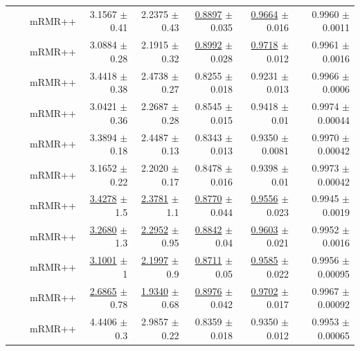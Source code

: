 \begin{longtable}{llp{}rrrrr}
 &  & mRMR++ & 3.1567 {\scriptsize $\pm$ 0.41} & 2.2375 {\scriptsize $\pm$ 0.43} & \underline{0.8897} {\scriptsize $\pm$ 0.035} & \underline{0.9664} {\scriptsize $\pm$ 0.016} & 0.9960 {\scriptsize $\pm$ 0.0011} \\
 &  & mRMR++ & 3.0884 {\scriptsize $\pm$ 0.28} & 2.1915 {\scriptsize $\pm$ 0.32} & \underline{0.8992} {\scriptsize $\pm$ 0.028} & \underline{0.9718} {\scriptsize $\pm$ 0.012} & 0.9961 {\scriptsize $\pm$ 0.0016} \\
 &  & mRMR++ & 3.4418 {\scriptsize $\pm$ 0.38} & 2.4738 {\scriptsize $\pm$ 0.27} & 0.8255 {\scriptsize $\pm$ 0.018} & 0.9231 {\scriptsize $\pm$ 0.013} & 0.9966 {\scriptsize $\pm$ 0.0006} \\
 &  & mRMR++ & 3.0421 {\scriptsize $\pm$ 0.36} & 2.2687 {\scriptsize $\pm$ 0.28} & 0.8545 {\scriptsize $\pm$ 0.015} & 0.9418 {\scriptsize $\pm$ 0.01} & 0.9974 {\scriptsize $\pm$ 0.00044} \\
 &  & mRMR++ & 3.3894 {\scriptsize $\pm$ 0.18} & 2.4487 {\scriptsize $\pm$ 0.13} & 0.8343 {\scriptsize $\pm$ 0.013} & 0.9350 {\scriptsize $\pm$ 0.0081} & 0.9970 {\scriptsize $\pm$ 0.00042} \\
 &  & mRMR++ & 3.1652 {\scriptsize $\pm$ 0.22} & 2.2020 {\scriptsize $\pm$ 0.17} & 0.8478 {\scriptsize $\pm$ 0.016} & 0.9398 {\scriptsize $\pm$ 0.01} & 0.9973 {\scriptsize $\pm$ 0.00042} \\
 &  & mRMR++ & \underline{3.4278} {\scriptsize $\pm$ 1.5} & \underline{2.3781} {\scriptsize $\pm$ 1.1} & \underline{0.8770} {\scriptsize $\pm$ 0.044} & \underline{0.9556} {\scriptsize $\pm$ 0.023} & 0.9945 {\scriptsize $\pm$ 0.0019} \\
 &  & mRMR++ & \underline{3.2680} {\scriptsize $\pm$ 1.3} & \underline{2.2952} {\scriptsize $\pm$ 0.95} & \underline{0.8842} {\scriptsize $\pm$ 0.04} & \underline{0.9603} {\scriptsize $\pm$ 0.021} & 0.9952 {\scriptsize $\pm$ 0.0016} \\
 &  & mRMR++ & \underline{3.1001} {\scriptsize $\pm$ 1} & \underline{2.1997} {\scriptsize $\pm$ 0.9} & \underline{0.8711} {\scriptsize $\pm$ 0.05} & \underline{0.9585} {\scriptsize $\pm$ 0.022} & 0.9956 {\scriptsize $\pm$ 0.00095} \\
 &  & mRMR++ & \underline{2.6865} {\scriptsize $\pm$ 0.78} & \underline{1.9340} {\scriptsize $\pm$ 0.68} & \underline{0.8976} {\scriptsize $\pm$ 0.042} & \underline{0.9702} {\scriptsize $\pm$ 0.017} & 0.9967 {\scriptsize $\pm$ 0.00092} \\
 &  & mRMR++ & 4.4406 {\scriptsize $\pm$ 0.3} & 2.9857 {\scriptsize $\pm$ 0.22} & 0.8359 {\scriptsize $\pm$ 0.018} & 0.9350 {\scriptsize $\pm$ 0.012} & 0.9953 {\scriptsize $\pm$ 0.00065} \\

\end{longtable}

